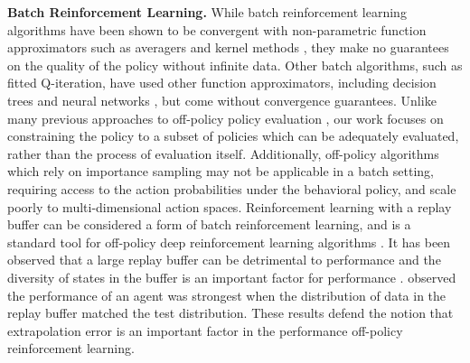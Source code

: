 \documentclass{article}
\begin{document}
\textbf{Batch Reinforcement Learning.} While batch reinforcement learning algorithms have been shown to be convergent with non-parametric function approximators such as averagers \citep{gordon1995stable} and kernel methods \citep{ormoneit2002kernel}, they make no guarantees on the quality of the policy without infinite data. Other batch algorithms, such as fitted Q-iteration, have used other function approximators, including decision trees \citep{ernst2005tree} and neural networks \citep{riedmiller2005neural}, but come without convergence guarantees. 
Unlike many previous approaches to off-policy policy evaluation \cite{peshkin2002learning, thomas2015high, liu2018representation},
our work focuses on constraining the policy to a subset of policies which can be adequately evaluated, rather than the process of evaluation itself. Additionally, off-policy algorithms which rely on importance sampling \citep{precup2001off, jiang2016doubly, munos2016safe} may not be applicable in a batch setting, requiring access to the action probabilities under the behavioral policy, and scale poorly to multi-dimensional action spaces. 
Reinforcement learning with a replay buffer \citep{expreplay1992} can be considered a form of batch reinforcement learning, and is a standard tool for off-policy deep reinforcement learning algorithms \citep{DQN}. It has been observed that a large replay buffer can be detrimental to performance \citep{de2015expreplay,zhang2017expreplay} and the diversity of states in the buffer is an important factor for performance \citep{de2016improved}. \citet{isele2018selective} observed the performance of an agent was strongest when the distribution of data in the replay buffer matched the test distribution. These results defend the notion that extrapolation error is an important factor in the performance off-policy reinforcement learning. 
\end{document}

